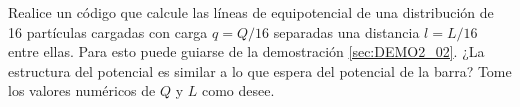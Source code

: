 Realice un código que calcule las líneas de equipotencial de una distribución
de 16 partículas cargadas con carga $q = Q/16$ separadas una distancia $l=L/16$
entre ellas. Para esto puede guiarse de la demostración \ref{sec:DEMO2_02}.
¿La estructura del potencial es similar a lo que espera del potencial de la 
barra? Tome los valores numéricos de $Q$ y $L$ como desee.


